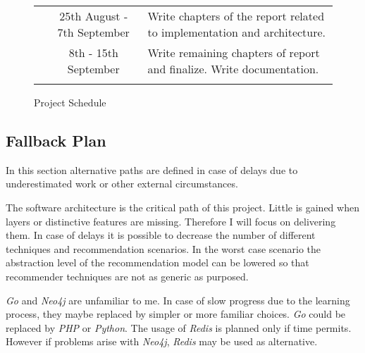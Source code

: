 \begin{figure}[ht]
\begin{tabularx}{\textwidth}{
        !{\vrule width 1pt} c !{\vrule width 1pt} c !{\vrule width 1pt} X !{\vrule width 1pt}
    }
        & 25th August - 7th September & Write chapters of the report related to implementation and architecture.\\

        & 8th - 15th September & Write remaining chapters of report and finalize.\newline
        Write documentation.\\

    \end{tabularx}
    \caption{Project Schedule}
    \label{fig:schedule}
\end{figure}

\subsection{Fallback Plan}

In this section alternative paths are defined in case of delays due to underestimated work or other external circumstances.

The software architecture is the critical path of this project. Little is gained when layers or distinctive features are missing. Therefore I will focus on delivering them. In case of delays it is possible to decrease the number of different techniques and recommendation scenarios. In the worst case scenario the abstraction level of the recommendation model can be lowered so that recommender techniques are not as generic as purposed.

\emph{Go} and \emph{Neo4j} are unfamiliar to me. In case of slow progress due to the learning process, they maybe replaced by simpler or more familiar choices. \emph{Go} could be replaced by \emph{PHP} or \emph{Python}. The usage of \emph{Redis} is planned only if time permits. However if problems arise with \emph{Neo4j}, \emph{Redis} may be used as alternative.